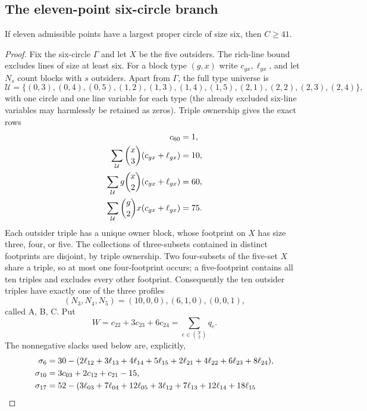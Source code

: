 \subsection{The eleven-point six-circle branch}

\begin{lemma}\label{lem:n11-gamma6}
If eleven admissible points have a largest proper circle of size six, then
$C\ge41$.
\end{lemma}

\begin{proof}
Fix the six-circle $\Gamma$ and let $X$ be the five outsiders.  The rich-line
bound excludes lines of size at least six.  For a block type $(g,x)$ write
$c_{gx},\ell_{gx}$, and let $N_s$ count blocks with $s$ outsiders.  Apart
from $\Gamma$, the full type universe is
\[
 \mathcal U=\{(0,3),(0,4),(0,5),(1,2),(1,3),(1,4),(1,5),
                 (2,1),(2,2),(2,3),(2,4)\},
\]
with one circle and one line variable for each type (the already excluded
six-line variables may harmlessly be retained as zeros).  Triple ownership
gives the exact rows
\begin{align}
c_{60}&=1,\notag\\
\sum_{\mathcal U}\binom{x}{3}(c_{gx}+\ell_{gx})&=10,\notag\\
\sum_{\mathcal U}g\binom{x}{2}(c_{gx}+\ell_{gx})&=60,\label{eq:n11-g6-triple-rows}\\
\sum_{\mathcal U}\binom g2x(c_{gx}+\ell_{gx})&=75.\notag
\end{align}
Each outsider triple has a unique owner block, whose footprint on $X$ has
 size three, four, or five.  The collections of three-subsets contained in
 distinct footprints are disjoint, by triple ownership.  Two four-subsets
 of the five-set $X$ share a triple, so at most one four-footprint occurs;
 a five-footprint contains all ten triples and excludes every other
 footprint.  Consequently the ten outsider triples have exactly one of the
 three profiles
\[
(N_3,N_4,N_5)=(10,0,0),(6,1,0),(0,0,1),
\]
 called A, B, C.  Put
\[
 W=c_{22}+3c_{23}+6c_{24}
   =\sum_{e\in\binom X2}q_e.
\]
The nonnegative slacks used below are, explicitly,
\begin{align}
\sigma_6={}&30-(2\ell_{12}+3\ell_{13}+4\ell_{14}+5\ell_{15}
 +2\ell_{21}+4\ell_{22}+6\ell_{23}+8\ell_{24}),\notag\\
\sigma_{10}={}&3c_{03}+2c_{12}+c_{21}-15,\notag\\
\sigma_{17}={}&52-(3\ell_{03}+7\ell_{04}+12\ell_{05}
 +3\ell_{12}+7\ell_{13}+12\ell_{14}+18\ell_{15}\notag\\

\end{align}
\end{proof}
